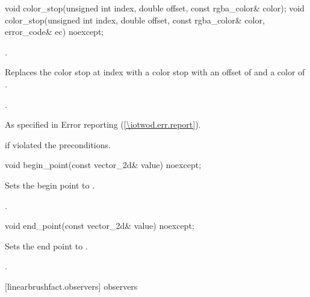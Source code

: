 \begin{itemdecl}
    void color_stop(unsigned int index, double offset,
      const rgba_color& color);
    void color_stop(unsigned int index, double offset,
      const rgba_color& color, error_code& ec) noexcept;
\end{itemdecl}
\begin{itemdescr}
	\pnum
	\requires
	.
	
	\pnum
	\effects
	Replaces the color stop at index  with a color stop with an offset of  and a color of .

	\pnum
	\postconditions
	.
	
	\pnum
	\throws
	As specified in Error reporting (\ref{\iotwod.err.report}).
	
	\pnum
	\errors
	 if  violated the preconditions.
\end{itemdescr}

\begin{itemdecl}
    void begin_point(const vector_2d& value) noexcept;
\end{itemdecl}
\begin{itemdescr}
	\pnum
	\effects
	Sets the begin point to .

	\pnum
	\postconditions
	.
	
\end{itemdescr}

\begin{itemdecl}
    void end_point(const vector_2d& value) noexcept;
\end{itemdecl}
\begin{itemdescr}
	\pnum
	\effects
	Sets the end point to .
	
	\pnum
	\postconditions
	.
	
\end{itemdescr}

 [linearbrushfact.observers] { observers}


